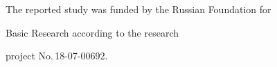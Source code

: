 

















\Ack


\noindent


The reported study was funded by the Russian Foundation for


Basic Research according to the research 


project No.\,18-07-00692.
















